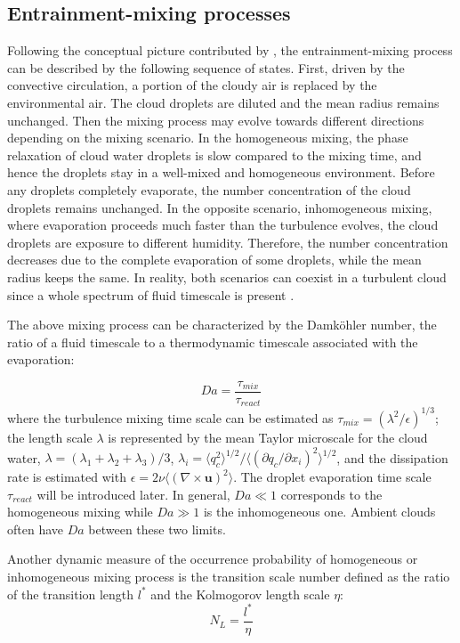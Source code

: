 \subsection{Entrainment-mixing processes}
Following the conceptual picture contributed by \cite{Krueger1997,Grabowski1993, Burnet1995}, 
the entrainment-mixing process can be described by the following sequence of states.  
First, driven by the convective circulation, a portion of the cloudy air is replaced 
by the environmental air. The cloud droplets are diluted and the mean radius remains 
unchanged. Then the mixing process may evolve towards different directions depending on the mixing 
scenario. In the homogeneous mixing, the phase relaxation of cloud water droplets is 
slow compared to the mixing time, and hence the droplets stay in a well-mixed and 
homogeneous environment. Before any droplets completely evaporate, the number concentration 
of the cloud droplets remains unchanged. In the opposite scenario, inhomogeneous 
mixing, where evaporation proceeds much faster than the turbulence evolves, 
the cloud droplets are exposure to different humidity. Therefore, the number concentration 
decreases due to the complete evaporation of some droplets, while the mean radius
keeps the same. In reality, both scenarios can coexist in a turbulent cloud since 
a whole spectrum of fluid timescale is present \cite{Lemann2009}.

The above mixing process can be characterized by the Damk{\"o}hler number, the ratio of 
a fluid timescale to a thermodynamic timescale associated with the evaporation:

\begin{equation}
Da=\frac{\tau_{mix}}{\tau_{react}}\label{eq:DaNumber}
\end{equation}
where the turbulence mixing time scale can be estimated as $\tau_{mix} = (\lambda^2/\epsilon)^{1/3}$; the 
length scale $\lambda$ is represented by the mean Taylor microscale for the cloud water, $\lambda = 
(\lambda_1+\lambda_2+\lambda_3)/3$, $\lambda_i = \langle q_c^2\rangle^{1/2}/\langle(\partial q_c/\partial 
x_i)^2\rangle^{1/2}$, and the dissipation rate is estimated with $\epsilon = 2\nu\langle(\nabla\times 
\mathbf{u})^2\rangle$. The droplet evaporation time scale $\tau_{react}$ will be introduced later.
In general, $Da\ll1$ corresponds to the homogeneous mixing while $Da\gg1$ is
the inhomogeneous one. Ambient clouds often have $Da$ between these two limits.

Another dynamic measure of the occurrence probability of homogeneous or inhomogeneous 
mixing process is the transition scale number \cite{Lu2011} defined as the ratio of 
the transition length $l^{*}$ and the Kolmogorov length scale $\eta$:
\begin{equation}
N_{L}=\frac{l^{*}}{\eta}\label{eq:NL}
\end{equation}
 
